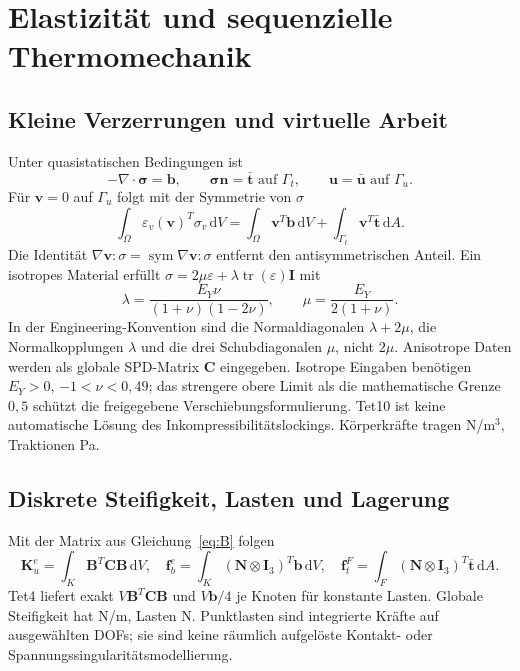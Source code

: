 \chapter{Elastizität und sequenzielle Thermomechanik}\label{chap:mechanics}
\section{Kleine Verzerrungen und virtuelle Arbeit}
Unter quasistatischen Bedingungen ist
\begin{equation}\label{eq:mechanical-strong}
-\nabla\cdot\boldsymbol\sigma=\mathbf b,\qquad
\boldsymbol\sigma\mathbf n=\bar{\mathbf t}\text{ auf }\Gamma_t,
\qquad\mathbf u=\bar{\mathbf u}\text{ auf }\Gamma_u.
\end{equation}
Für $\mathbf v=0$ auf $\Gamma_u$ folgt mit der Symmetrie von $\sigma$
\begin{equation}\label{eq:mechanical-weak}
\int_\Omega\varepsilon_v(\mathbf v)^T\sigma_v\,\mathrm dV
=\int_\Omega\mathbf v^T\mathbf b\,\mathrm dV+
\int_{\Gamma_t}\mathbf v^T\bar{\mathbf t}\,\mathrm dA.
\end{equation}
Die Identität $\nabla\mathbf v:\sigma=\operatorname{sym}\nabla\mathbf v:\sigma$
entfernt den antisymmetrischen Anteil. Ein isotropes Material erfüllt
$\sigma=2\mu\varepsilon+\lambda\operatorname{tr}(\varepsilon)\mathbf I$ mit
\begin{equation}\label{eq:lame}
\lambda=\frac{E_Y\nu}{(1+\nu)(1-2\nu)},\qquad
\mu=\frac{E_Y}{2(1+\nu)}.
\end{equation}
In der Engineering-Konvention sind die Normaldiagonalen $\lambda+2\mu$,
die Normalkopplungen $\lambda$ und die drei Schubdiagonalen $\mu$, nicht $2\mu$.
Anisotrope Daten werden als globale SPD-Matrix $\mathbf C$ eingegeben.
Isotrope Eingaben benötigen $E_Y>0$, $-1<\nu<0{,}49$; das strengere obere Limit
als die mathematische Grenze $0{,}5$ schützt die freigegebene
Verschiebungsformulierung. Tet10 ist keine automatische Lösung des
Inkompressibilitätslockings. Körperkräfte tragen N/m$^3$, Traktionen Pa.

\section{Diskrete Steifigkeit, Lasten und Lagerung}
Mit der Matrix aus Gleichung~\ref{eq:B} folgen
\begin{equation}\label{eq:mechanical-element}
\mathbf K_u^e=\int_K\mathbf B^T\mathbf C\mathbf B\,\mathrm dV,
\quad\mathbf f_b^e=\int_K(\mathbf N\otimes\mathbf I_3)^T\mathbf b\,\mathrm dV,
\quad\mathbf f_t^F=\int_F(\mathbf N\otimes\mathbf I_3)^T\bar{\mathbf t}\,\mathrm dA.
\end{equation}
Tet4 liefert exakt $V\mathbf B^T\mathbf C\mathbf B$ und
$V\mathbf b/4$ je Knoten für konstante Lasten. Globale Steifigkeit hat N/m,
Lasten N. Punktlasten sind integrierte Kräfte auf ausgewählten DOFs; sie sind
keine räumlich aufgelöste Kontakt- oder Spannungssingularitätsmodellierung.

